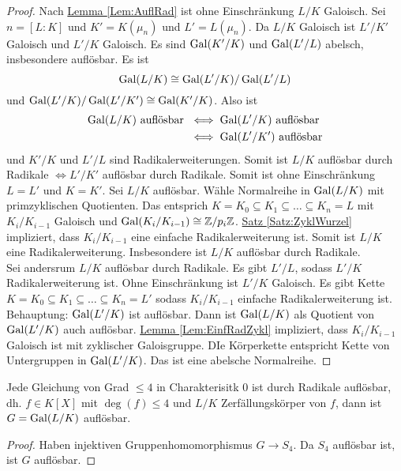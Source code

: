 \begin{proof}
    Nach \hyperref[Lem:AuflRad]{Lemma \ref{Lem:AuflRad}} ist ohne Einschränkung \(L/K\) Galoisch.
    Sei \(n=[L:K]\) und \(K'=K(\mu_n)\) und \(L'=L(\mu_n)\).
    Da \(L/K\) Galoisch ist \(L'/K'\) Galoisch und \(L'/K\) Galoisch. Es sind \(\operatorname{Gal}(K'/K)\) und \(\operatorname{Gal}(L'/L)\) abelsch, insbesondere auflösbar.
    Es ist \[\operatorname{Gal}(L/K)\cong \operatorname{Gal}(L'/K)/\operatorname{Gal}(L'/L)\] und \(\operatorname{Gal}(L'/K)/\operatorname{Gal}(L'/K')\cong \operatorname{Gal}(K'/K)\).
    Also ist \begin{align*}
        \operatorname{Gal}(L/K)\text{ auflösbar }&\iff \operatorname{Gal}(L'/K) \text{ auflösbar}\\
        &\iff \operatorname{Gal}(L'/K') \text{ auflösbar}
    \end{align*}
    und \(K'/K\) und \(L'/L\) sind Radikalerweiterungen. Somit ist \(L/K\) auflösbar durch Radikale \(\iff L'/K'\) auflösbar durch Radikale. Somit ist ohne Einschränkung \(L=L'\) und \(K=K'\).
    Sei \(L/K\) auflösbar. Wähle Normalreihe in \(\operatorname{Gal}(L/K)\) mit primzyklischen Quotienten. Das entsprich \(K=K_0\subseteq K_1\subseteq\dots\subseteq K_n=L\) mit \(K_i/K_{i-1}\) Galoisch und \(\operatorname{Gal}(K_i/K_{i-1})\cong \mathbb{Z}/p_i\mathbb{Z}\).  \hyperref[Satz:ZyklWurzel]{Satz \ref{Satz:ZyklWurzel}} impliziert, dass \(K_i/K_{i-1}\) eine einfache Radikalerweiterung ist. Somit ist \(L/K\) eine Radikalerweiterung. Insbesondere ist \(L/K\) auflösbar durch Radikale.\\
    Sei andersrum \(L/K\) auflösbar durch Radikale. Es gibt \(L'/L\), sodass \(L'/K\) Radikalerweiterung ist. Ohne Einschränkung ist \(L'/K\) Galoisch. Es gibt Kette \(K=K_0\subseteq K_1\subseteq\dots\subseteq K_n=L'\) sodass \(K_i/K_{i-1}\) einfache Radikalerweiterung ist.
    Behauptung: \(\operatorname{Gal}(L'/K)\) ist auflösbar. Dann ist \(\operatorname{Gal}(L/K)\) als Quotient von \(\operatorname{Gal}(L'/K)\) auch auflösbar.
    \hyperref[Lem:EinfRadZykl]{Lemma \ref{Lem:EinfRadZykl}} impliziert, dass \(K_i/K_{i-1}\) Galoisch ist mit zyklischer Galoisgruppe. DIe Körperkette entspricht Kette von Untergruppen in \(\operatorname{Gal}(L'/K)\). Das ist eine abelsche Normalreihe.
\end{proof}
\begin{Kor}
    Jede Gleichung von Grad \(\leq 4\) in Charakterisitk \(0\) ist durch Radikale auflösbar, dh. \(f\in K[X]\) mit \(\deg(f)\leq 4\) und \(L/K\) Zerfällungskörper von \(f\), dann ist \(G=\operatorname{Gal}(L/K)\) auflösbar.
\end{Kor}
\begin{proof}
    Haben injektiven Gruppenhomomorphismus \(G\to S_4\). Da \(S_4\) auflösbar ist, ist \(G\) auflösbar.
\end{proof}

